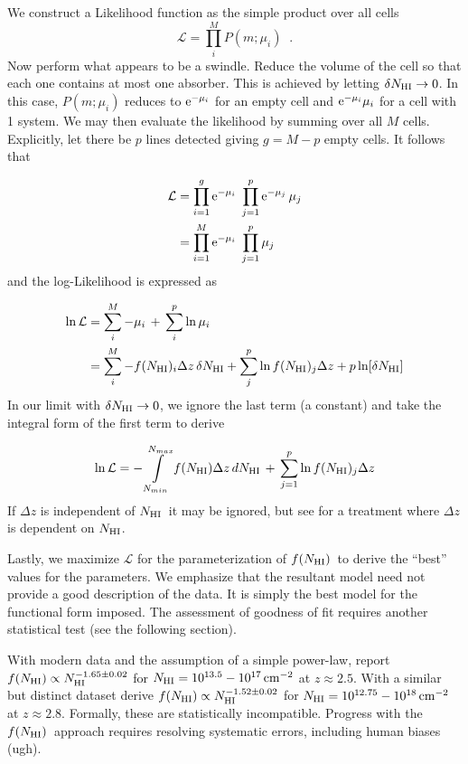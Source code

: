 \documentclass[graybox]{svmult}
\def\smm{\sum\limits}
\def\intl{\int\limits}
\newcommand{\mnhi}{N_{\rm HI}}
\newcommand{\nhi}{$\mnhi$}
\def\cm#1{\, {\rm cm^{#1}}}
\def\mfnhi{f(\mnhi)}
\def\fnhi{$\mfnhi$}
\def\prodl{\prod\limits}
\begin{document}
We construct a Likelihood function as the 
simple product over all cells
\begin{equation}
\mathcal{L} = \prodl_i^M P(m; \mu_i) \;\; .
\end{equation}
Now perform what appears to be a swindle.
Reduce the volume of the cell so that each one contains
at most one absorber.  This is achieved by letting
$\delta\mnhi \to 0$.
In this case, $P(m;\mu_i)$ reduces to ${\rm e}^{-\mu_i}$ for an
empty cell and ${\rm e}^{-\mu_i} \mu_i$ for a cell with 1 system.
We may then evaluate the likelihood
by summing over all $M$ cells.  Explicitly,  
let there be $p$ lines detected giving $g=M-p$ empty cells.
It follows that 

\begin{align}
\mathcal{L} &= \prodl_{i=1}^g {\rm e}^{-\mu_i} \;
\prodl_{j=1}^p {\rm e}^{-\mu_j} \, \mu_j \\
&= \prodl_{i=1}^M {\rm e}^{-\mu_i} \; \prodl_{j=1}^p \mu_j
\end{align}
and the log-Likelihood is expressed as

\begin{align}
\ln \mathcal{L} &= \smm_i^M -\mu_i \, + \, \smm_i^p \ln \mu_i \\
&= \smm_i^M -f(\mnhi)_i \Delta z \, \delta\mnhi +
\smm_j^p \ln f(\mnhi)_j \Delta z + p \ln [\delta\mnhi]
\label{eqn:max_fN}
\end{align}
In our limit with $\delta\mnhi \to 0$,
we ignore the last term (a constant) and take the integral form
of the first term to derive

\begin{equation}
\ln \mathcal{L} = - \intl_{N_{min}}^{N_{max}} f(\mnhi) \Delta z \, d\mnhi 
\, + \, \smm_{j=1}^p \ln f(\mnhi)_j \Delta z
\end{equation}
If $\Delta z$ is independent of \nhi\ it may be ignored,
but see \cite{cooksey10} for a treatment where
$\Delta z$ is dependent on \nhi.

Lastly, we maximize $\mathcal{L}$ for the parameterization of \fnhi\
to derive the ``best'' values for the parameters.
We emphasize that the resultant model need not 
provide a good description of the data.  It is simply the 
best model for the functional form imposed.
The assessment of goodness of fit requires another statistical
test (see the following section).

With modern data and the assumption of a simple
power-law, \cite{rudie13} report
$\mfnhi \propto \mnhi^{-1.65 \pm 0.02}$ for
$\mnhi = 10^{13.5} - 10^{17} \cm{-2}$ at $z \approx 2.5$.
With a similar but distinct dataset 
\cite{kim13} derive
$\mfnhi \propto \mnhi^{-1.52 \pm 0.02}$
for $\mnhi = 10^{12.75} - 10^{18} \cm{-2}$
at $z \approx 2.8$.
Formally, these are statistically incompatible.
Progress with the \fnhi\ approach
requires resolving systematic errors, including
human biases (ugh).
\end{document}
